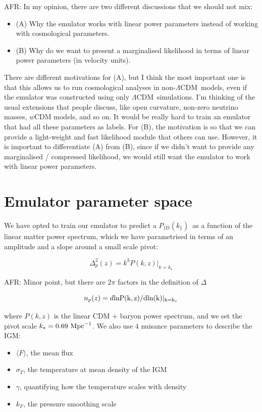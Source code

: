 \documentclass[preprintnumbers,prd,superscriptaddress,notitlepage,nofootinbib] {revtex4-1}
\newcommand{\afr}[1]{{\color{red}AFR: #1}}
\newcommand{\fluxpower}{$P_\mathrm{1D}(k_\parallel)$}
\newcommand\LCDM{$\Lambda$CDM}
\begin{document}
\afr{In my opinion, there are two different discussions that we should not mix:
\begin{itemize}
 \item (A) Why the emulator works with linear power parameters instead of working with cosmological parameters.
 \item (B) Why do we want to present a marginalised likelihood in terms of linear power parameters (in velocity units).
 \end{itemize}
There are different motivations for (A), but I think the most important one is that this allows us to run cosmological analyses in non-\LCDM\ models, even if the emulator was constructed using only \LCDM\ simulations. I'm thinking of the usual extensions that people discuss, like open curvature, non-zero neutrino masses, $w$CDM models, and so on. 
It would be really hard to train an emulator that had all these parameters as labels.
For (B), the motivation is so that we can provide a light-weight and fast likelihood module that
others can use.
However, it is important to differentiate (A) from (B), since if we didn't want to provide any
marginalised / compressed likelihood, we would still want the emulator to work with linear
power parameters.}



\section{Emulator parameter space}

We have opted to train our emulator to predict a \fluxpower\ as
a function of the linear matter power spectrum, which we have parametrised in
terms of an amplitude and a slope around a small scale pivot:

\begin{equation}
    \label{eq:Delta2_p}
    \Delta^2_p(z)=k^3P(k, z)|_{k=k_\star}
\end{equation}

\afr{Minor point, but there are $2 \pi$ factors in the definition of $\Delta$}

\begin{equation}
    \label{eq:n_p}
    n_p(z)=d\rm{ln}P(k,z) / d \rm{ln}(k)|_{k=k_\star}
\end{equation}

where $P(k,z)$ is the linear CDM + baryon power spectrum, and we set the pivot
scale $k_\star=0.69 \ \text{Mpc}^{-1}$. We also use $4$ nuisance parameters
to describe the IGM:

\begin{itemize}
    \item $\langle F \rangle$, the mean flux
    \item $\sigma_T$, the temperature at mean density of the IGM
    \item $\gamma$, quantifying how the temperature scales with density
    \item $k_F$, the pressure smoothing scale
\end{itemize}
\end{document}
